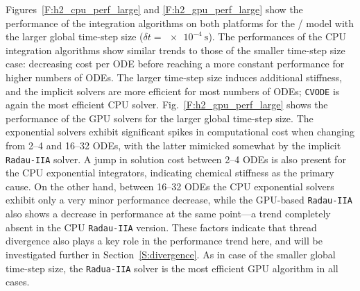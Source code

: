 \documentclass[preprint,review,11pt]{elsarticle}
\begin{document}
Figures~\ref{F:h2_cpu_perf_large} and \ref{F:h2_gpu_perf_large} show the performance of the integration algorithms on both platforms for the \slash{} model with the larger global time-step size ($\delta t=\SI{e-4}{\second}$).
The performances of the CPU integration algorithms show similar trends to those of the smaller time-step size case: decreasing cost per ODE before reaching a more constant performance for higher numbers of ODEs.
The larger time-step size induces additional stiffness, and the implicit solvers are more efficient for most numbers of ODEs; \texttt{CVODE} is again the most efficient CPU solver.
Fig.~\ref{F:h2_gpu_perf_large} shows the performance of the GPU solvers for the larger global time-step size.
The exponential solvers exhibit significant spikes in computational cost when changing from 2--4 and 16--32 ODEs, with the latter mimicked somewhat by the implicit \texttt{Radau-IIA} solver.
A jump in solution cost between 2--4 ODEs is also present for the CPU exponential integrators, indicating chemical stiffness as the primary cause.
On the other hand, between 16--32 ODEs the CPU exponential solvers exhibit only a very minor performance decrease, while the GPU-based \texttt{Radau-IIA} also shows a decrease in performance at the same point---a trend completely absent in the CPU \texttt{Radau-IIA} version.
These factors indicate that thread divergence also plays a key role in the performance trend here, and will be investigated further in Section~\ref{S:divergence}.
As in case of the smaller global time-step size, the \texttt{Radua-IIA} solver is the most efficient GPU algorithm in all cases.
\end{document}
